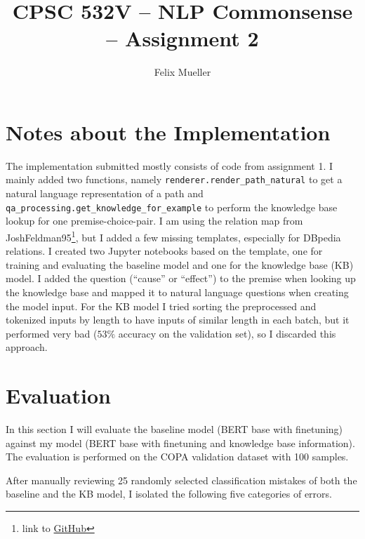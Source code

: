\documentclass{article}
\begin{document}

\title{CPSC 532V -- NLP Commonsense -- Assignment 2}
\author{Felix Mueller}
\date{}
\maketitle

\section*{Notes about the Implementation}
\label{sec:implementation}

The implementation submitted mostly consists of code from assignment
1.  I mainly added two functions, namely
\verb|renderer.render_path_natural| to get a natural language
representation of a path and
\verb|qa_processing.get_knowledge_for_example| to perform the
knowledge base lookup for one premise-choice-pair.  I am using the
relation map from JoshFeldman95\footnote{link to
  \href{https://github.com/JoshFeldman95/Extracting-CK-from-Large-LM/blob/master/templates/relation_map.json}{GitHub}},
but I added a few missing templates, especially for DBpedia relations.
I created two Jupyter notebooks based on the template, one for
training and evaluating the baseline model and one for the knowledge
base (KB) model.  I added the question (``cause'' or ``effect'') to
the premise when looking up the knowledge base and mapped it to
natural language questions when creating the model input.  For the KB
model I tried sorting the preprocessed and tokenized inputs by length
to have inputs of similar length in each batch, but it performed very
bad ($53\%$ accuracy on the validation set), so I discarded this
approach.



\section*{Evaluation}
\label{sec:step-1:-implement}

In this section I will evaluate the baseline model (\textsc{BERT} base
with finetuning) against my model (\textsc{BERT} base with finetuning
and knowledge base information).  The evaluation is performed on the
\textsc{COPA} validation dataset with 100 samples.

After manually reviewing 25 randomly selected classification mistakes
of both the baseline and the KB model, I isolated the following five
categories of errors.
\end{document}
